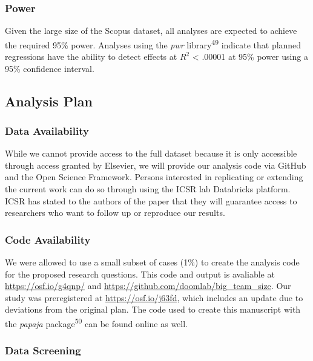 \documentclass[
  man,floatsintext]{apa6}
\begin{document}
\hypertarget{power}{%
\subsubsection{Power}\label{power}}

Given the large size of the Scopus dataset, all analyses are expected to achieve the required 95\% power. Analyses using the \emph{pwr} library\textsuperscript{49} indicate that planned regressions have the ability to detect effects at \(R^2\) \textless{} .00001 at 95\% power using a 95\% confidence interval.

\hypertarget{analysis-plan}{%
\subsection{Analysis Plan}\label{analysis-plan}}

\hypertarget{data-availability}{%
\subsubsection{Data Availability}\label{data-availability}}

While we cannot provide access to the full dataset because it is only accessible through access granted by Elsevier, we will provide our analysis code via GitHub and the Open Science Framework. Persons interested in replicating or extending the current work can do so through using the ICSR lab Databricks platform. ICSR has stated to the authors of the paper that they will guarantee access to researchers who want to follow up or reproduce our results.

\hypertarget{code-availability}{%
\subsubsection{Code Availability}\label{code-availability}}

We were allowed to use a small subset of cases (1\%) to create the analysis code for the proposed research questions. This code and output is avaliable at \url{https://osf.io/g4qnp/} and \url{https://github.com/doomlab/big_team_size}. Our study was preregistered at \url{https://osf.io/j63fd}, which includes an update due to deviations from the original plan. The code used to create this manuscript with the \emph{papaja} package\textsuperscript{50} can be found online as well.

\hypertarget{data-screening}{%
\subsubsection{Data Screening}\label{data-screening}}
\end{document}
